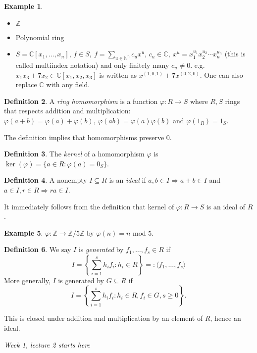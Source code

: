 \documentclass[a4paper]{article}
\newcommand{\la}{\langle}
\newcommand{\ra}{\rangle}
\newcommand{\Z}{\mathbb Z}
\newcommand{\C}{\mathbb C}
\newcommand{\Mod}{\text{ mod }}
\theoremstyle{definition}
\newtheorem{defn}{Definition}[subsection]
\newtheorem{example}[defn]{Example}
\begin{document}
\begin{example}
\begin{itemize}
\item $\Z$
\item Polynomial ring
\item $S=\C[x_1,\ldots,x_n]$, $\displaystyle f\in S,\ f=\sum_{u\in \mathbb N^n} c_u x^u$, $c_u\in \C,\ x^u=x_1^{u_1} x_2^{u_2} \cdots x_n^{u_n}$ (this is called multiindex notation) and only finitely many $c_u\neq 0$. e.g. $x_1 x_3 + 7x_2\in \C[x_1,x_2,x_3]$ is written as $x^{(1,0,1)}+7x^{(0,2,0)}$. One can also replace $\C$ with any field.
\end{itemize}
\end{example}
\begin{defn}
A \textit{ring homomorphism} is a function $\varphi:R\rightarrow S$ where $R,S$ rings that respects addition and multiplication: $\varphi(a+b)=\varphi(a)+\varphi(b),\ \varphi(ab)=\varphi(a)\varphi(b)$ and $\varphi(1_R)=1_S$.
\end{defn}
The definition implies that homomorphisms preserve 0.

\begin{defn}
The \textit{kernel} of a homomorphism $\varphi$ is $\ker (\varphi) = \{a\in R:\varphi(a)=0_S\}$.
\end{defn}

\begin{defn}
A nonempty $I\subseteq R$ is an \textit{ideal} if $a,b\in I \Rightarrow a+b\in I$ and $a\in I,r\in R\Rightarrow ra\in I$.
\end{defn}

It immediately follows from the definition that kernel of $\varphi:R\rightarrow S$ is an ideal of $R$.

\begin{example}
$\varphi:\Z \rightarrow \Z/5\Z$ by $\varphi(n) = n\Mod 5$.
\end{example}

\begin{defn}
We say $I$ is \textit{generated} by $f_1,\ldots,f_s\in R$ if
\[
I=\left\{\sum_{i=1}^s h_i f_i : h_i\in R \right\} =: \la f_1,\ldots,f_s\ra
\]
More generally, $I$ is generated by $G\subseteq R$ if
\[
I=\left\{\sum_{i=1}^s h_i f_i : h_i\in R, f_i\in G,s\geq 0 \right\}.
\]
\end{defn}
This is closed under addition and multiplication by an element of $R$, hence an ideal.

\begin{flushright}
\textit{Week 1, lecture 2 starts here}
\end{flushright}
\end{document}

